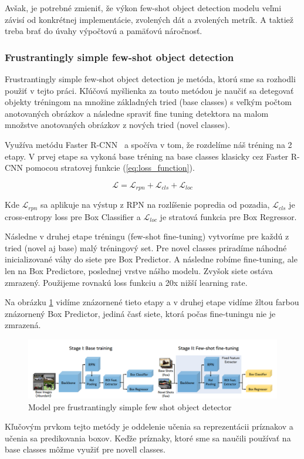 Avšak, je potrebné zmieniť, že výkon few-shot object detection modelu veľmi závisí od konkrétnej implementácie, zvolených dát a zvolených metrík. A taktiež treba brať do úvahy výpočtovú a pamäťovú náročnosť.

\subsubsection{Frustrantingly simple few-shot object detection}

Frustrantingly simple few-shot object detection \cite{FSFSODT} je metóda, ktorú sme sa rozhodli použiť v tejto práci. Kľúčová myšlienka za touto metódou je naučiť sa detegovať objekty tréningom na množine základných tried (base classes) s veľkým počtom anotovaných obrázkov a následne spraviť fine tuning detektora na malom množstve anotovaných obrázkov z nových tried (novel classes). 

Využíva metódu Faster R-CNN~\cite{Faster} a spočíva v tom, že rozdelíme náš tréning na 2 etapy. V prvej etape sa vykoná base tréning na base classes klasicky cez Faster R-CNN pomocou stratovej funkcie (\ref{eq:loss_function}). 

\begin{equation}
\mathcal{L} = \mathcal{L}_{rpn} + \mathcal{L}_{cls} + \mathcal{L}_{loc}
\label{eq:loss_function}
\end{equation}

Kde $\mathcal{L}_{rpn}$ sa aplikuje na výstup z RPN na rozlíšenie popredia od pozadia, $\mathcal{L}_{cls}$ je cross-entropy loss pre Box Classifier a $\mathcal{L}_{loc}$ je stratová funkcia pre Box Regressor.

Následne v druhej etape tréningu (few-shot fine-tuning) vytvoríme pre každú z tried (novel aj base) malý tréningový set. Pre novel classes priradíme náhodné inicializované váhy do siete pre Box Predictor. A následne robíme fine-tuning, ale len na Box Predictore, poslednej vrstve nášho modelu. Zvyšok siete ostáva zmrazený. Použijeme rovnakú loss funkciu a 20x nižší learning rate.

Na obrázku \ref{fig:image305} vidíme znázornené tieto etapy a v druhej etape vidíme žltou farbou znázornený Box Predictor, jediná časť siete, ktorá počas fine-tuningu nie je zmrazená.

\begin{figure}[H]
\includegraphics[width=\textwidth]{images/FSFSOD_model.png}
\caption{Model pre frustrantingly simple few shot object detector}
\label{fig:image305}
\end{figure}

Kľučovým prvkom tejto metódy je oddelenie učenia sa reprezentácii príznakov a učenia sa predikovania boxov. Keďže príznaky, ktoré sme sa naučili používať na base classes môžme využiť pre novell classes.


